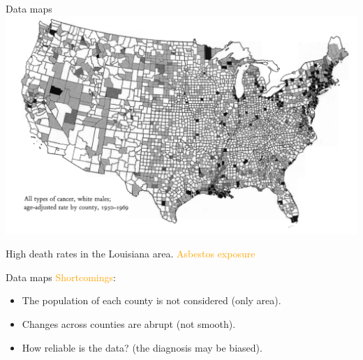 \documentclass[
  ignorenonframetext,
]{beamer}
\begin{document}
\begin{frame}{Data maps}
\protect\hypertarget{data-maps-3}{}
\includegraphics{excellence_figs/fig_10.png}

High death rates in the Louisiana area.
\textcolor{orange}{Asbestos exposure}
\end{frame}

\begin{frame}{Data maps}
\protect\hypertarget{data-maps-4}{}
\textcolor{orange}{Shortcomings}:

\begin{itemize}
\item
  The population of each county is not considered (only area).
\item
  Changes across counties are abrupt (not smooth).
\item
  How reliable is the data? (the diagnosis may be biased).
\end{itemize}
\end{frame}
\end{document}
